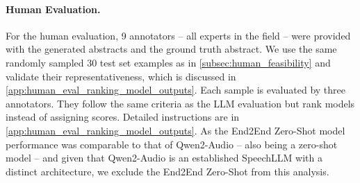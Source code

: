 \paragraph{Human Evaluation.}
For the human evaluation, 
9 annotators -- all experts in the field -- were provided 
with the generated abstracts and the ground truth abstract. We use the same randomly sampled 30 test set examples as in \cref{subsec:human_feasibility} and validate their representativeness, which is discussed in \cref{app:human_eval_ranking_model_outputs}.
Each sample is evaluated by three annotators. 
They follow the same criteria as the LLM evaluation but rank models instead of assigning scores. 
Detailed instructions are in \cref{app:human_eval_ranking_model_outputs}. 
As the End2End Zero-Shot model performance was comparable to that of Qwen2-Audio -- also being a zero-shot model -- and given that Qwen2-Audio is an established SpeechLLM with a distinct architecture, we exclude the End2End Zero-Shot from this analysis.





